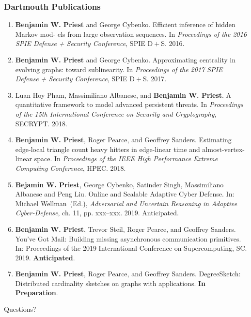 \documentclass{beamer}
\begin{document}
\begin{frame}
\frametitle{Dartmouth Publications}

{\scriptsize
\begin{enumerate}
\item \textbf{Benjamin W. Priest} and George Cybenko.
	Efficient inference of hidden Markov mod- els from large observation sequences.
	In \emph{Proceedings of the 2016 SPIE Defense + Security Conference}, 
	SPIE D$\! + \!$S.
	2016.

\item \textbf{Benjamin W. Priest} and George Cybenko.
	Approximating centrality in evolving graphs: toward sublinearity.
	In \emph{Proceedings of the 2017 SPIE Defense + Security Conference}, 
	SPIE D$\! + \!$S.
	2017.

\item Luan Hoy Pham, Massimiliano Albanese, and \textbf{Benjamin W. Priest}.
	A quantitative framework to model advanced persistent threats.
	In \emph{Proceedings of the 15th International Conference on Security and Cryptography}, 
	SECRYPT. 
	2018.
	
\item \textbf{Benjamin W. Priest}, Roger Pearce, and Geoffrey Sanders.
	Estimating edge-local triangle count heavy hitters in edge-linear time and almost-vertex-linear space.
	In \emph{Proceedings of the IEEE High Performance Extreme Computing Conference}, 
	HPEC. 
	2018.
	
\item \textbf{Bejamin W. Priest}, George Cybenko, Satinder Singh, Massimiliano Albanese and Peng Liu.
	Online and Scalable Adaptive Cyber Defense. 
	In:
	Michael Wellman~(Ed.), \emph{Adversarial and Uncertain Reasoning in Adaptive Cyber-Defense}, ch.
	11, pp. xxx--xxx. 2019.
	Anticipated.

\item \textbf{Benjamin W. Priest}, Trevor Steil, Roger Pearce, and Geoffrey Sanders.
	You've {G}ot {M}ail: Building missing asynchronous communication primitives.
	In:
	Proceedings of the 2019 International Conference on Supercomputing,
	SC.
	2019.
	\textbf{Anticipated}.
	
\item \textbf{Benjamin W. Priest}, Roger Pearce, and Geoffrey Sanders.
	DegreeSketch: Distributed cardinality sketches on graphs with applications.
	\textbf{In Preparation}.
\end{enumerate}
}

\end{frame}


\begin{frame}

\begin{center}
{\Huge Questions?}
\end{center}

\end{frame}


 
 
%
\end{document}
